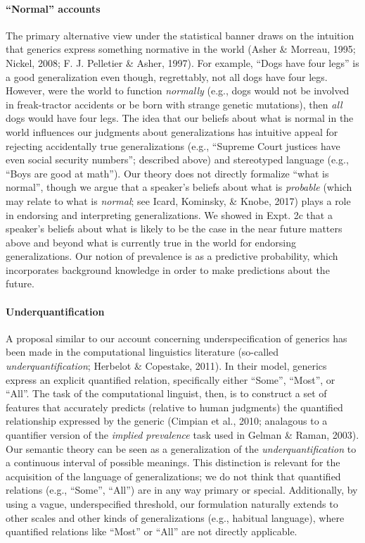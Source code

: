 \documentclass[english,floatsintext,man]{apa6}
\theoremstyle{definition}
\theoremstyle{definition}
\theoremstyle{definition}
\theoremstyle{remark}
\begin{document}
\paragraph{\texorpdfstring{\enquote{Normal}
accounts}{Normal accounts}}\label{normal-accounts}

The primary alternative view under the statistical banner draws on the
intuition that generics express something normative in the world (Asher
\& Morreau, 1995; Nickel, 2008; F. J. Pelletier \& Asher, 1997). For
example, \enquote{Dogs have four legs} is a good generalization even
though, regrettably, not all dogs have four legs. However, were the
world to function \emph{normally} (e.g., dogs would not be involved in
freak-tractor accidents or be born with strange genetic mutations), then
\emph{all} dogs would have four legs. The idea that our beliefs about
what is normal in the world influences our judgments about
generalizations has intuitive appeal for rejecting accidentally true
generalizations (e.g., \enquote{Supreme Court justices have even social
security numbers}; described above) and stereotyped language (e.g.,
\enquote{Boys are good at math}). Our theory does not directly formalize
\enquote{what is normal}, though we argue that a speaker's beliefs about
what is \emph{probable} (which may relate to what is \emph{normal}; see
Icard, Kominsky, \& Knobe, 2017) plays a role in endorsing and
interpreting generalizations. We showed in Expt. 2c that a speaker's
beliefs about what is likely to be the case in the near future matters
above and beyond what is currently true in the world for endorsing
generalizations. Our notion of prevalence is as a predictive
probability, which incorporates background knowledge in order to make
predictions about the future.

\paragraph{Underquantification}\label{underquantification}

A proposal similar to our account concerning underspecification of
generics has been made in the computational linguistics literature
(so-called \emph{underquantification}; Herbelot \& Copestake, 2011). In
their model, generics express an explicit quantified relation,
specifically either \enquote{Some}, \enquote{Most}, or \enquote{All}.
The task of the computational linguist, then, is to construct a set of
features that accurately predicts (relative to human judgments) the
quantified relationship expressed by the generic (Cimpian et al., 2010;
analagous to a quantifier version of the \emph{implied prevalence} task
used in Gelman \& Raman, 2003). Our semantic theory can be seen as a
generalization of the \emph{underquantification} to a continuous
interval of possible meanings. This distinction is relevant for the
acquisition of the language of generalizations; we do not think that
quantified relations (e.g., \enquote{Some}, \enquote{All}) are in any
way primary or special. Additionally, by using a vague, underspecified
threshold, our formulation naturally extends to other scales and other
kinds of generalizations (e.g., habitual language), where quantified
relations like \enquote{Most} or \enquote{All} are not directly
applicable.
\end{document}
